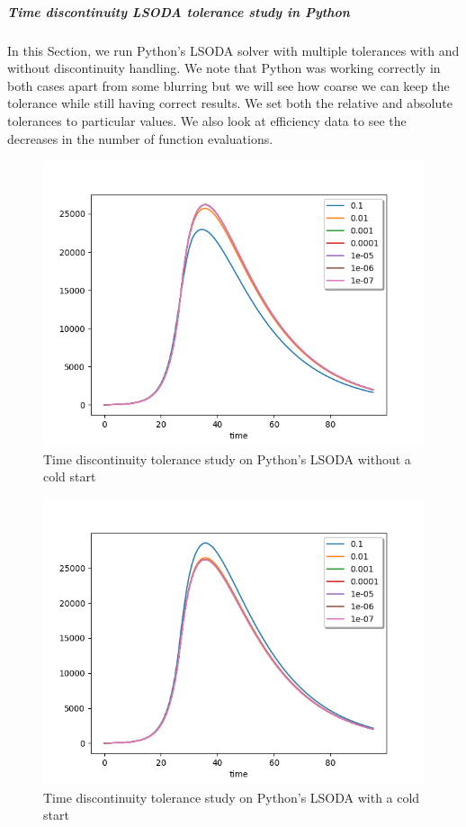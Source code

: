 \subparagraph{Time discontinuity LSODA tolerance study in Python}
In this Section, we run Python's LSODA solver with multiple tolerances with and without discontinuity handling. We note that Python was working correctly in both cases apart from some blurring but we will see how coarse we can keep the tolerance while still having correct results. We set both the relative and absolute tolerances to particular values. We also look at efficiency data to see the decreases in the number of function evaluations.

\begin{figure}[h]
	\centering
	\includegraphics[width=0.7\linewidth]{./figures/tolerance_time_lsoda_no_event_py}
	\caption{Time discontinuity tolerance study on Python's LSODA without a cold start}
	\label{fig:tolerance_time_lsoda_no_event_py}
\end{figure}

\begin{figure}[h]
	\centering
	\includegraphics[width=0.7\linewidth]{./figures/tolerance_time_lsoda_with_event_py}
	\caption{Time discontinuity tolerance study on Python's LSODA with a cold start}
	\label{fig:tolerance_time_lsoda_with_event_py}
\end{figure}


